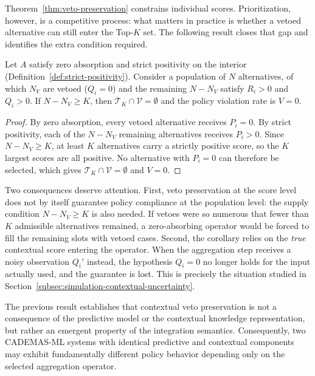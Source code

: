 \documentclass[mathematics,article,submit,moreauthors]{Definitions/mdpi}
\begin{document}
{\color{teal}Theorem~\ref{thm:veto-preservation} constrains individual
scores. Prioritization, however, is a competitive process: what matters in
practice is whether a vetoed alternative can still enter the Top-$K$ set.
The following result closes that gap and identifies the extra condition
required.

\begin{Corollary}
\label{cor:topk-exclusion}
Let $A$ satisfy zero absorption and strict positivity on the interior
(Definition~\ref{def:strict-positivity}). Consider a population of $N$
alternatives, of which $N_V$ are vetoed ($Q_i=0$) and the remaining
$N-N_V$ satisfy $R_i>0$ and $Q_i>0$. If $N-N_V\ge K$, then
$\mathcal{T}_K\cap\mathcal{V}=\emptyset$ and the policy violation rate is
$V=0$.
\end{Corollary}

\begin{proof}
By zero absorption, every vetoed alternative receives $P_i=0$. By strict
positivity, each of the $N-N_V$ remaining alternatives receives $P_i>0$.
Since $N-N_V\ge K$, at least $K$ alternatives carry a strictly positive
score, so the $K$ largest scores are all positive. No alternative with
$P_i=0$ can therefore be selected, which gives
$\mathcal{T}_K\cap\mathcal{V}=\emptyset$ and $V=0$.
\end{proof}

Two consequences deserve attention. First, veto preservation at the score
level does not by itself guarantee policy compliance at the population
level: the supply condition $N-N_V\ge K$ is also needed. If vetoes were so
numerous that fewer than $K$ admissible alternatives remained, a
zero-absorbing operator would be forced to fill the remaining slots with
vetoed cases. Second, the corollary relies on the \emph{true} contextual
score entering the operator. When the aggregation step receives a noisy
observation $Q_i'$ instead, the hypothesis $Q_i=0$ no longer holds for the
input actually used, and the guarantee is lost. This is precisely the
situation studied in
Section~\ref{subsec:simulation-contextual-uncertainty}.}

The previous result establishes that contextual veto preservation is
not a consequence of the predictive model or the contextual knowledge
representation, but rather an emergent property of the integration
semantics. Consequently, two CADEMAS-ML systems with identical
predictive and contextual components may exhibit fundamentally different
policy behavior depending only on the selected aggregation operator.
\end{document}
